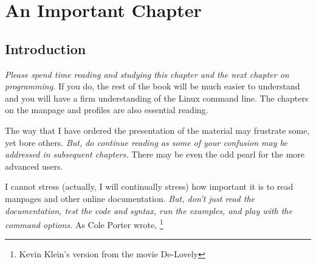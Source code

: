 \chapter{An Important Chapter}
\label{ch:impch}
\pagestyle{fancy}

\fancyhf{} %
\fancyhead[OC]{\leftmark} %
\setlength{\headheight}{13.99pt} 
\cfoot{\thepage} %
		

\section{Introduction}

\textit{Please spend time reading and studying this chapter and the next chapter on programming.} If you do, the rest of the book will be much easier to understand and you will have a firm understanding of the Linux command line. The chapters on the manpage and profiles are also essential reading.

The way that I have ordered the presentation of the material may frustrate some, yet bore others. \textit{But, do continue reading as some of your confusion may be addressed in subsequent chapters.} There may be even the odd pearl for the more advanced users.

I cannot stress (actually, I will continually stress) how important it is to read manpages and other online documentation. \textit{But, don't just read the documentation, test the code and syntax, run the examples, and play with the command options.} As Cole Porter wrote, \footnote{Kevin Klein's version from the movie De-Lovely}

